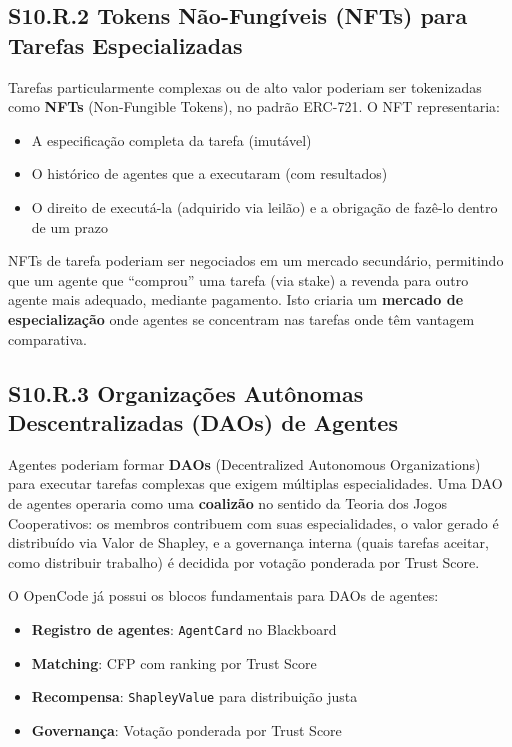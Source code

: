 \subsection*{S10.R.2 Tokens Não-Fungíveis (NFTs) para Tarefas Especializadas}

Tarefas particularmente complexas ou de alto valor poderiam ser tokenizadas como \textbf{NFTs} (Non-Fungible Tokens), no padrão ERC-721. O NFT representaria:
\begin{itemize}
    \item A especificação completa da tarefa (imutável)
    \item O histórico de agentes que a executaram (com resultados)
    \item O direito de executá-la (adquirido via leilão) e a obrigação de fazê-lo dentro de um prazo
\end{itemize}

NFTs de tarefa poderiam ser negociados em um mercado secundário, permitindo que um agente que ``comprou'' uma tarefa (via stake) a revenda para outro agente mais adequado, mediante pagamento. Isto criaria um \textbf{mercado de especialização} onde agentes se concentram nas tarefas onde têm vantagem comparativa.

\subsection*{S10.R.3 Organizações Autônomas Descentralizadas (DAOs) de Agentes}

Agentes poderiam formar \textbf{DAOs} (Decentralized Autonomous Organizations) para executar tarefas complexas que exigem múltiplas especialidades. Uma DAO de agentes operaria como uma \textbf{coalizão} no sentido da Teoria dos Jogos Cooperativos: os membros contribuem com suas especialidades, o valor gerado é distribuído via Valor de Shapley, e a governança interna (quais tarefas aceitar, como distribuir trabalho) é decidida por votação ponderada por Trust Score.

O OpenCode já possui os blocos fundamentais para DAOs de agentes:
\begin{itemize}
    \item \textbf{Registro de agentes}: \texttt{AgentCard} no Blackboard
    \item \textbf{Matching}: CFP com ranking por Trust Score
    \item \textbf{Recompensa}: \texttt{ShapleyValue} para distribuição justa
    \item \textbf{Governança}: Votação ponderada por Trust Score
\end{itemize}

